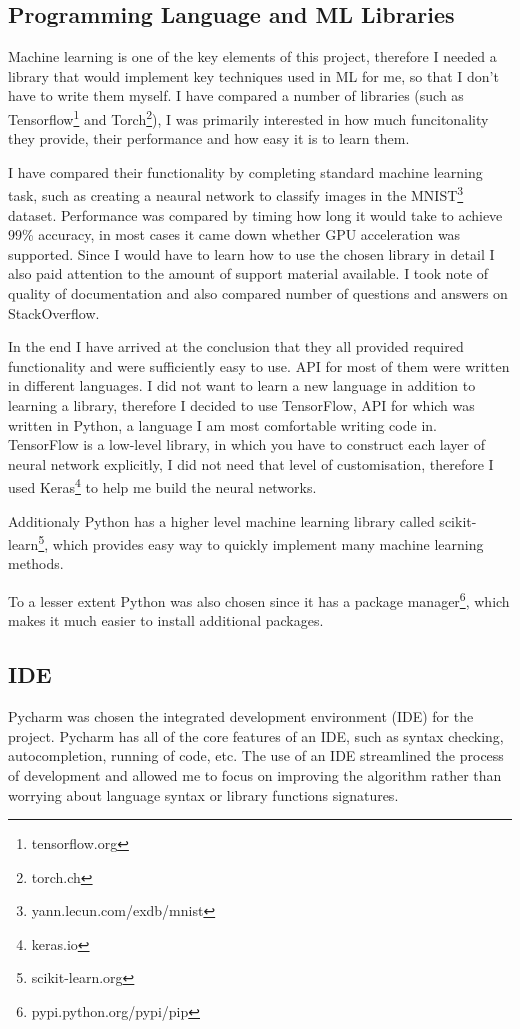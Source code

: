 \documentclass[12pt,a4paper]{book}
\begin{document}
\subsection{Programming Language and ML Libraries}
Machine learning is one of the key elements of this project, therefore I needed a library that would implement key techniques used in ML for me, so that I don't have to write them myself.
I have compared a number of libraries (such as Tensorflow\footnote{tensorflow.org} and Torch\footnote{torch.ch}), I was primarily interested in how much funcitonality they provide, their performance and how easy it is to learn them.

I have compared their functionality by completing standard machine learning task, such as creating a neaural network to classify images in the MNIST\footnote{yann.lecun.com/exdb/mnist} dataset.
Performance was compared by timing how long it would take to achieve 99\% accuracy, in most cases it came down whether GPU acceleration was supported.
Since I would have to learn how to use the chosen library in detail I also paid attention to the amount of support material available.
I took note of quality of documentation and also compared number of questions and answers on StackOverflow.

In the end I have arrived at the conclusion that they all provided required functionality and were sufficiently easy to use.
API for most of them were written in different languages.
I did not want to learn a new language in addition to learning a library, therefore I decided to use TensorFlow, API for which was written in Python, a language I am most comfortable writing code in.
TensorFlow is a low-level library, in which you have to construct each layer of neural network explicitly, I did not need that level of customisation, therefore I used Keras\footnote{keras.io} to help me build the neural networks.

Additionaly Python has a higher level machine learning library called scikit-learn\footnote{scikit-learn.org}, which provides easy way to quickly implement many machine learning methods.

To a lesser extent Python was also chosen since it has a package manager\footnote{pypi.python.org/pypi/pip}, which makes it much easier to install additional packages.

\subsection{IDE}
Pycharm was chosen the integrated development environment (IDE) for the project.
Pycharm has all of the core features of an IDE, such as syntax checking, autocompletion, running of code, etc.
The use of an IDE streamlined the process of development and allowed me to focus on improving the algorithm rather than worrying about language syntax or library functions signatures. 
\end{document}
